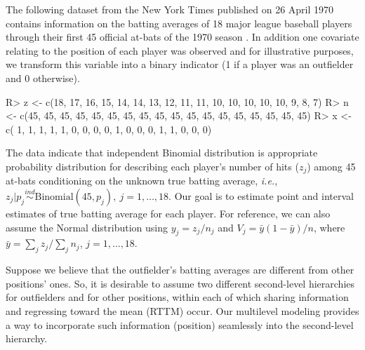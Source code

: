 \documentclass[article]{jss}
\begin{document}
The following dataset from the New York Times published on 26 April 1970 contains information on the batting averages of 18 major league baseball players through their first 45 official at-bats of the 1970 season \citep{1975}. In addition one covariate relating to the position of each player was observed and for illustrative purposes, we transform this variable into a binary indicator (1 if a player was an outfielder and 0 otherwise).
\begin{CodeChunk}
\begin{CodeInput}
R> z <- c(18, 17, 16, 15, 14, 14, 13, 12, 11, 11, 10, 10, 10, 10, 10,  9,  8,  7)
R> n <- c(45, 45, 45, 45, 45, 45, 45, 45, 45, 45, 45, 45, 45, 45, 45, 45, 45, 45)
R> x <- c( 1,  1,  1,  1,  1,  0,  0,  0,  0,  1,  0,  0,  0,  1,  1,  0,  0,  0) 
\end{CodeInput}
\end{CodeChunk}


The data indicate that independent Binomial distribution is appropriate probability distribution for describing each player's number of hits ($z_{j}$) among 45 at-bats conditioning on the unknown true batting average, \emph{i.e.}, $z_{j}\vert p_{j}\stackrel{ind}{\sim} \textrm{Binomial}(45, p_{j}), ~j=1, \ldots, 18$. Our goal is to estimate point and interval estimates of true batting average for each player. For reference, we can also assume the Normal distribution using $y_{j}=z_{j} / n_{j}$ and $V_{j}=\bar{y}(1-\bar{y})/n$, where $\bar{y}=\sum_{j} z_{j} / \sum_{j} n_{j}$, $j=1,\ldots, 18$. 



Suppose we believe that the outfielder's batting averages are different from other positions' ones.  So, it is desirable to assume two different second-level hierarchies for outfielders and for other positions, within each of which sharing information and regressing toward the mean (RTTM) occur. Our multilevel modeling provides a way to incorporate such information (position) seamlessly into the second-level hierarchy.
\end{document}
